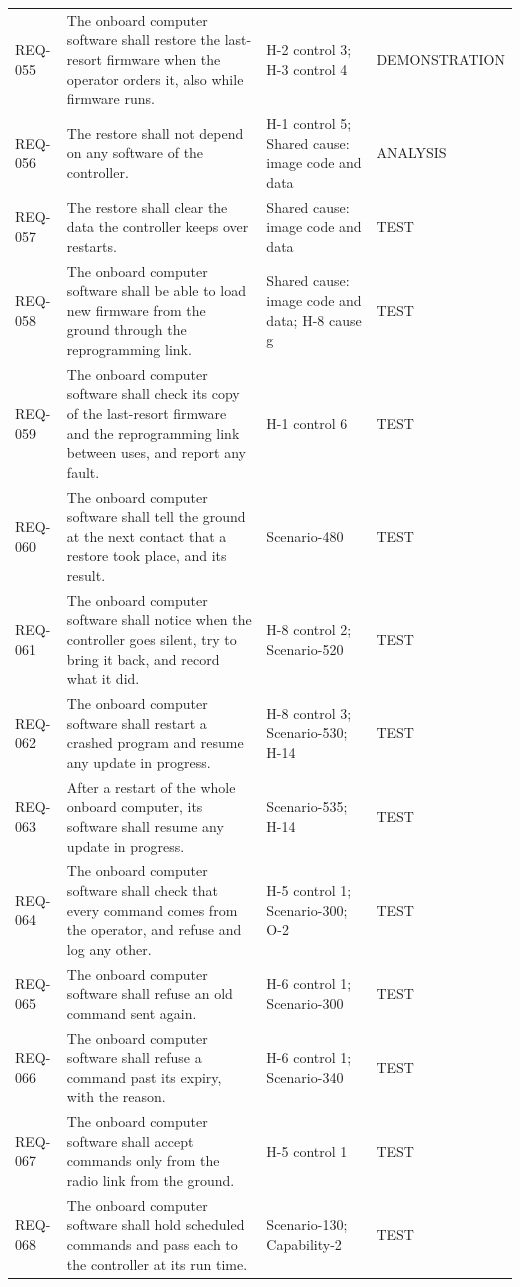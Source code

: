 \documentclass[11pt,a4paper]{article}
\begin{document}
{\begin{xltabular}{\textwidth}{@{}l>{\raggedright\arraybackslash}X>{\raggedright\arraybackslash}p{3.2cm}>{\raggedright\arraybackslash}p{3.0cm}@{}}
REQ-055 & The onboard computer software shall restore the last-resort firmware when the operator orders it, also while firmware runs. & H-2 control 3; H-3 control 4 & DEMONSTRATION \\
REQ-056 & The restore shall not depend on any software of the controller. & H-1 control 5; Shared cause: image code and data & ANALYSIS \\
REQ-057 & The restore shall clear the data the controller keeps over restarts. & Shared cause: image code and data & TEST \\
REQ-058 & The onboard computer software shall be able to load new firmware from the ground through the reprogramming link. & Shared cause: image code and data; H-8 cause g & TEST \\
REQ-059 & The onboard computer software shall check its copy of the last-resort firmware and the reprogramming link between uses, and report any fault. & H-1 control 6 & TEST \\
REQ-060 & The onboard computer software shall tell the ground at the next contact that a restore took place, and its result. & Scenario-480 & TEST \\
REQ-061 & The onboard computer software shall notice when the controller goes silent, try to bring it back, and record what it did. & H-8 control 2; Scenario-520 & TEST \\
REQ-062 & The onboard computer software shall restart a crashed program and resume any update in progress. & H-8 control 3; Scenario-530; H-14 & TEST \\
REQ-063 & After a restart of the whole onboard computer, its software shall resume any update in progress. & Scenario-535; H-14 & TEST \\
REQ-064 & The onboard computer software shall check that every command comes from the operator, and refuse and log any other. & H-5 control 1; Scenario-300; O-2 & TEST \\
REQ-065 & The onboard computer software shall refuse an old command sent again. & H-6 control 1; Scenario-300 & TEST \\
REQ-066 & The onboard computer software shall refuse a command past its expiry, with the reason. & H-6 control 1; Scenario-340 & TEST \\
REQ-067 & The onboard computer software shall accept commands only from the radio link from the ground. & H-5 control 1 & TEST \\
REQ-068 & The onboard computer software shall hold scheduled commands and pass each to the controller at its run time. & Scenario-130; Capability-2 & TEST \\

\end{xltabular}}
\end{document}
